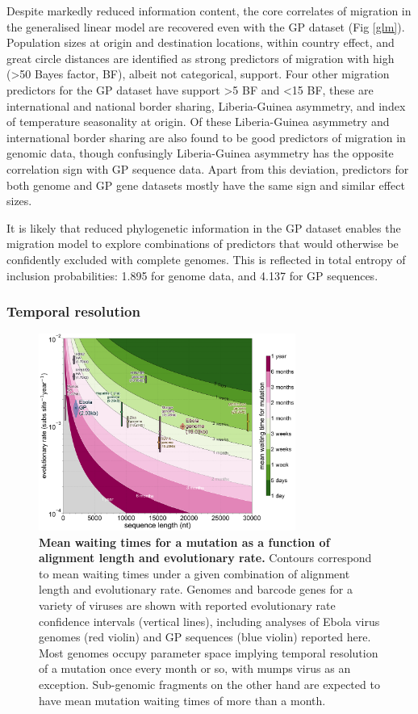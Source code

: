 \documentclass[11pt,oneside,letterpaper]{article}
\begin{document}
Despite markedly reduced information content, the core correlates of migration in the generalised linear model are recovered even with the GP dataset (Fig \ref{glm}).
Population sizes at origin and destination locations, within country effect, and great circle distances are identified as strong predictors of migration with high (>50 Bayes factor, BF), albeit not categorical, support.
Four other migration predictors for the GP dataset have support >5 BF and <15 BF, these are international and national border sharing, Liberia-Guinea asymmetry, and index of temperature seasonality at origin.
Of these Liberia-Guinea asymmetry and international border sharing are also found to be good predictors of migration in genomic data, though confusingly Liberia-Guinea asymmetry has the opposite correlation sign with GP sequence data.
Apart from this deviation, predictors for both genome and GP gene datasets mostly have the same sign and similar effect sizes.

It is likely that reduced phylogenetic information in the GP dataset enables the migration model to explore combinations of predictors that would otherwise be confidently excluded with complete genomes.
This is reflected in total entropy of inclusion probabilities: 1.895 for genome data, and 4.137 for GP sequences.

\subsubsection*{Temporal resolution}

\begin{figure}[h]
 \centering
	\includegraphics[width=0.75\textwidth]{figures/fig5_contours.png}
	\caption{\textbf{Mean waiting times for a mutation as a function of alignment length and evolutionary rate.}
  Contours correspond to mean waiting times under a given combination of alignment length and evolutionary rate.
  Genomes and barcode genes for a variety of viruses are shown with reported evolutionary rate confidence intervals (vertical lines), including analyses of Ebola virus genomes (red violin) and GP sequences (blue violin) reported here.
  Most genomes occupy parameter space implying temporal resolution of a mutation once every month or so, with mumps virus as an exception.
  Sub-genomic fragments on the other hand are expected to have mean mutation waiting times of more than a month.
	}
	\label{contours}
\end{figure}
\end{document}
